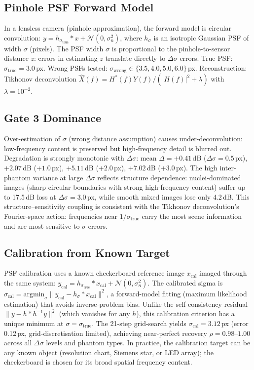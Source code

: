 \documentclass[11pt]{article}
\theoremstyle{definition}
\begin{document}
\subsection{Pinhole PSF Forward Model}
In a lensless camera (pinhole approximation), the forward model is circular convolution:
$y = h_{\sigma_\mathrm{true}} * x + \mathcal{N}(0, \sigma_n^2)$,
where $h_\sigma$ is an isotropic Gaussian PSF of width $\sigma$ (pixels).
The PSF width $\sigma$ is proportional to the pinhole-to-sensor distance $z$:
errors in estimating $z$ translate directly to $\Delta\sigma$ errors.
True PSF: $\sigma_\mathrm{true}{=}3.0$\,px. Wrong PSFs tested: $\sigma_\mathrm{wrong} \in \{3.5, 4.0, 5.0, 6.0\}$\,px.
Reconstruction: Tikhonov deconvolution $\hat{X}(f) = H^*(f)Y(f) / (|H(f)|^2 + \lambda)$ with $\lambda{=}10^{-2}$.

\subsection{Gate 3 Dominance}
Over-estimation of $\sigma$ (wrong distance assumption) causes under-deconvolution:
low-frequency content is preserved but high-frequency detail is blurred out.
Degradation is strongly monotonic with $\Delta\sigma$:
mean $\Delta{=}+0.41$\,dB ($\Delta\sigma{=}0.5$\,px), $+2.07$\,dB ($+1.0$\,px), $+5.11$\,dB ($+2.0$\,px), $+7.02$\,dB ($+3.0$\,px).
The high inter-phantom variance at large $\Delta\sigma$ reflects structure dependence:
nuclei-dominated images (sharp circular boundaries with strong high-frequency content) suffer up to 17.5\,dB loss
at $\Delta\sigma{=}3.0$\,px, while smooth mixed images lose only 4.2\,dB.
This structure--sensitivity coupling is consistent with the Tikhonov deconvolution's Fourier-space action:
frequencies near $1/\sigma_\mathrm{true}$ carry the most scene information and are most sensitive to $\sigma$ errors.

\subsection{Calibration from Known Target}
PSF calibration uses a known checkerboard reference image $x_\mathrm{cal}$ imaged through the same system:
$y_\mathrm{cal} = h_{\sigma_\mathrm{true}} * x_\mathrm{cal} + \mathcal{N}(0, \sigma_n^2)$.
The calibrated sigma is $\sigma_\mathrm{cal} = \mathrm{argmin}_\sigma \| y_\mathrm{cal} - h_\sigma * x_\mathrm{cal} \|^2$,
a forward-model fitting (maximum likelihood estimation) that avoids inverse-problem bias.
Unlike the self-consistency residual $\|y - h * h^{-1}y\|^2$ (which vanishes for any $h$),
this calibration criterion has a unique minimum at $\sigma{=}\sigma_\mathrm{true}$.
The 21-step grid-search yields $\sigma_\mathrm{cal}{=}3.12$\,px (error 0.12\,px, grid-discretisation limited),
achieving near-perfect recovery $\rho{=}0.98$--$1.00$ across all $\Delta\sigma$ levels and phantom types.
In practice, the calibration target can be any known object (resolution chart, Siemens star, or LED array);
the checkerboard is chosen for its broad spatial frequency content.
\end{document}

